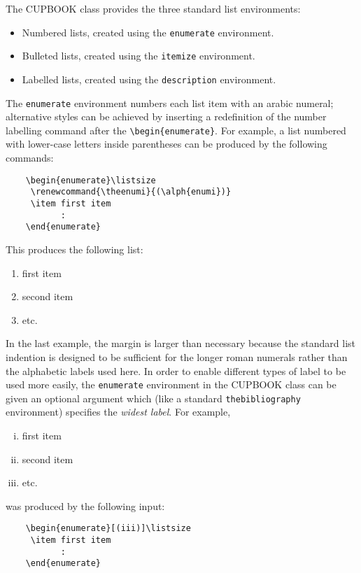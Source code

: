 \documentclass[cup6a]{cupbook}
\begin{document}
The CUPBOOK class provides the three standard list environments:
 \begin{itemize}\listsize
  \item Numbered lists, created using the \verb"enumerate" environment.
  \item Bulleted lists, created using the \verb"itemize" environment.
  \item Labelled lists, created using the \verb"description" environment.
 \end{itemize}
 The \verb"enumerate" environment numbers each list item with an arabic
numeral; alternative styles can be achieved by inserting a redefinition
of the number labelling command after the \verb"\begin{enumerate}".
 For example, a list numbered with lower-case letters inside parentheses
can be produced by the following commands:
 \begin{verbatim}
    \begin{enumerate}\listsize
     \renewcommand{\theenumi}{(\alph{enumi})}
     \item first item
           :
    \end{enumerate}
\end{verbatim}
 This produces the following list:
 \begin{enumerate}\listsize
  \renewcommand{\theenumi}{(\alph{enumi})}
  \item first item
  \item second item
  \item etc.
 \end{enumerate}
 In the last example, the margin is larger than necessary
because the standard list indention is designed to be sufficient for
the longer roman numerals rather than the alphabetic labels used here.
 In order to enable different types of label to be used more easily, the
\verb"enumerate" environment in the CUPBOOK class can be given an
optional argument which (like a standard \verb"thebibliography"
environment) specifies the \emph{widest label}.
 For example,
 \begin{enumerate}[(iii)]\listsize
  \item first item
  \item second item
  \item etc.
 \end{enumerate}
 was produced by the following input:
 \begin{verbatim}
    \begin{enumerate}[(iii)]\listsize
     \item first item
           :
    \end{enumerate}
\end{verbatim}
\end{document}
